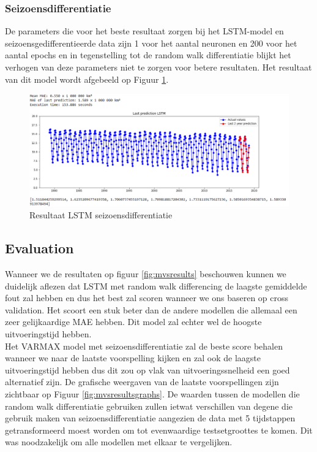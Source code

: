 \subsubsection{Seizoensdifferentiatie}
De parameters die voor het beste resultaat zorgen bij het LSTM-model en seizoensgedifferentieerde data zijn 1 voor het aantal neuronen en 200 voor het aantal epochs en in tegenstelling tot de random walk differentiatie blijkt het verhogen van deze parameters niet te zorgen voor betere resultaten. Het resultaat van dit model wordt afgebeeld op Figuur \ref{fig:mvslstmsdiff}.


\begin{figure}
    \centering
    \caption{Resultaat LSTM seizoensdifferentiatie}
    \label{fig:mvslstmsdiff}
    \includegraphics[width=1\linewidth]{mv_s_lstm_s_diff}
\end{figure}

\clearpage

\subsection{Evaluation}
Wanneer we de resultaten op figuur \ref{fig:mvsresults} beschouwen kunnen we duidelijk aflezen dat LSTM met random walk differencing de laagste gemiddelde fout zal hebben en dus het best zal scoren wanneer we ons baseren op cross validation. Het scoort een stuk beter dan de andere modellen die allemaal een zeer gelijkaardige MAE hebben. Dit model zal echter wel de hoogste uitvoeringstijd hebben. \\

Het VARMAX model met seizoensdifferentiatie zal de beste score behalen wanneer we naar de laatste voorspelling kijken en zal ook de laagste uitvoeringstijd hebben dus dit zou op vlak van uitvoeringssnelheid een goed alternatief zijn. De grafische weergaven van de laatste voorspellingen zijn zichtbaar op Figuur \ref{fig:mvsresultsgraphs}. De waarden tussen de modellen die random walk differentiatie gebruiken zullen ietwat verschillen van degene die gebruik maken van seizoensdifferentiatie aangezien de data met 5 tijdstappen getransformeerd moest worden om tot evenwaardige testsetgroottes te komen. Dit was noodzakelijk om alle modellen met elkaar te vergelijken.


